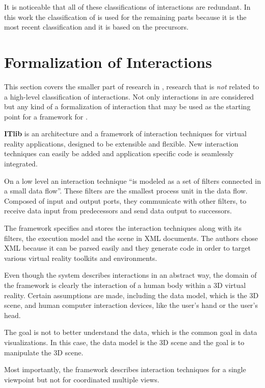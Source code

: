 It is noticeable that all of these classifications of interactions are redundant.
In this work the classification of \textcite{Yi2007} is used for the remaining parts because it is the most recent classification and it is based on the precursors.


\section{Formalization of Interactions}
This section covers the smaller part of research in \cmvs{}, research that is \emph{not} related to a high-level classification of interactions.
Not only interactions in \cmvs{} are considered but any kind of a formalization of interaction that may be used as the starting point for a framework for \cmvs{}.

\textbf{ITlib\cite{Figueroa2001}} is an architecture and a framework of interaction techniques for virtual reality applications, designed to be extensible and flexible.
New interaction techniques can easily be added and application specific code is seamlessly integrated.

On a low level an interaction technique ``is modeled as a set of filters connected in a small data flow''\cite[p.~2]{Figueroa2001}.
These filters are the smallest process unit in the data flow.
Composed of input and output ports, they communicate with other filters, to receive data input from predecessors and send data output to successors.

The framework specifies and stores the interaction techniques along with its filters, the execution model and the scene in XML documents.
The authors chose XML because it can be parsed easily and they generate code in order to target various virtual reality toolkits and environments.

Even though the system describes interactions in an abstract way, the domain of the framework is clearly the interaction of a human body within a 3D virtual reality.
Certain assumptions are made, including the data model, which is the 3D scene, and human computer interaction devices, like the user's hand or the user's head.

The goal is not to better understand the data, which is the common goal in data visualizations.
In this case, the data model is the 3D scene and the goal is to manipulate the 3D scene.

Most importantly, the framework describes interaction techniques for a single viewpoint but not for coordinated multiple views.

